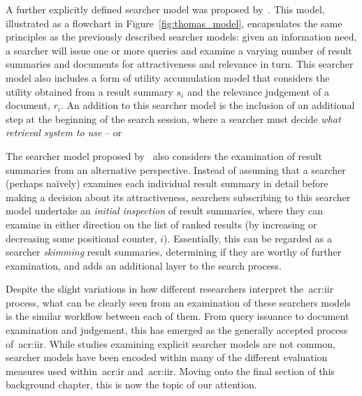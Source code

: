 A further explicitly defined searcher model was proposed by~\cite{thomas2014modelling_behaviour}. This model, illustrated as a flowchart in Figure~\ref{fig:thomas_model}, encapsulates the same principles as the previously described searcher models: given an information need, a searcher will issue one or more queries and examine a varying number of result summaries and documents for attractiveness and relevance in turn. This searcher model also includes a form of utility accumulation model that considers the utility obtained from a result summary $s_i$ and the relevance judgement of a document, $r_i$. An addition to this searcher model is the inclusion of an additional step at the beginning of the search session, where a searcher must decide \emph{what retrieval system to use} -- or 


The searcher model proposed by~\cite{thomas2014modelling_behaviour} also considers the examination of result summaries from an alternative perspective. Instead of assuming that a searcher (perhaps na\"{i}vely) examines each individual result summary in detail before making a decision about its attractiveness, searchers subscribing to this searcher model undertake an \emph{initial inspection} of result summaries, where they can examine in either direction on the list of ranked results (by increasing or decreasing some positional counter, $i$). Essentially, this can be regarded as a searcher \emph{skimming} result summaries, determining if they are worthy of further examination, and adds an additional layer to the search process.

Despite the slight variations in how different researchers interpret the~\gls{acr:iir} process, what can be clearly seen from an examination of these searchers models is the similar workflow between each of them. From query issuance to document examination and judgement, this has emerged as the generally accepted process of~\gls{acr:iir}. While studies examining explicit searcher models are not common, searcher models have been encoded within many of the different evaluation measures used within~\gls{acr:ir} and~\gls{acr:iir}. Moving onto the final section of this background chapter, this is now the topic of our attention.

